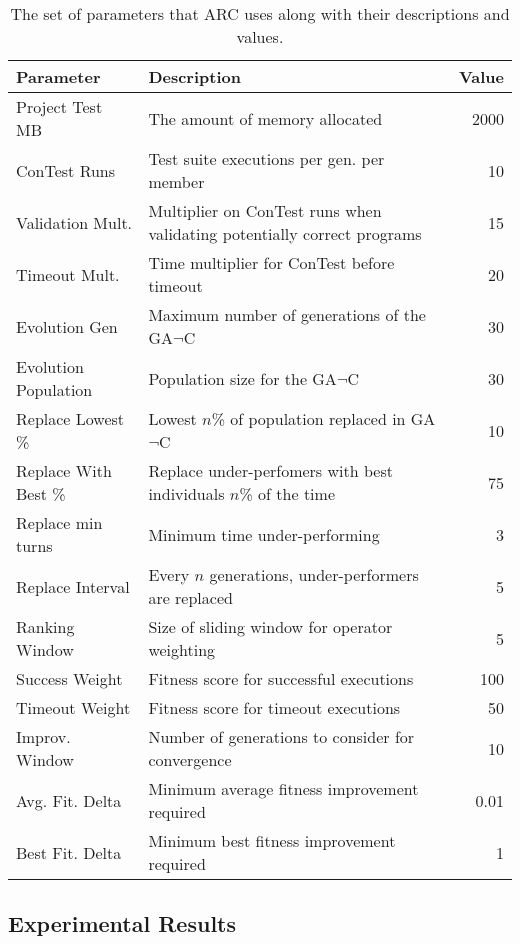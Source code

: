 \documentclass[runningheads,a4paper]{llncs}
\begin{document}
\begin{table}[t!]
\caption{The set of parameters that ARC uses along with their descriptions and values.}
\begin{center}
\lstset{basicstyle=\scriptsize}
\begin{tabular}{|l|p{7.5cm}|r|}
\hline
\textbf{Parameter} & \textbf{Description} & \textbf{Value}\\
\hline
Project Test MB & The amount of memory allocated  & 2000\\
\hline
ConTest Runs & Test suite executions per gen. per member & 10\\
\hline
Validation Mult. & Multiplier on ConTest runs when validating potentially correct programs & 15\\
\hline
Timeout Mult. & Time multiplier for ConTest before timeout & 20\\
\hline
Evolution Gen & Maximum number of generations of the GA$\neg$C & 30\\
\hline
Evolution Population & Population size for the GA$\neg$C & 30\\
\hline
Replace Lowest \% & Lowest $n$\% of population replaced in GA$\neg$C & 10\\
\hline
Replace With Best \% & Replace under-perfomers with best individuals $n$\% of the time & 75\\
\hline
Replace min turns & Minimum time under-performing & 3\\
\hline
Replace Interval & Every $n$ generations, under-performers are replaced & 5\\
\hline
Ranking Window & Size of sliding window for operator weighting & 5\\
\hline
Success Weight & Fitness score for successful executions & 100\\
\hline
Timeout Weight & Fitness score for timeout executions & 50\\
\hline
Improv. Window & Number of generations to consider for convergence & 10\\
\hline
Avg. Fit. Delta & Minimum average fitness improvement required & 0.01\\
\hline
Best Fit. Delta & Minimum best fitness improvement required & 1\\
\hline
\end{tabular}
\label{tbl:used_parameters}
\end{center}
\end{table}

\subsection{Experimental Results}
\label{sec:experimental_results}
\end{document}
